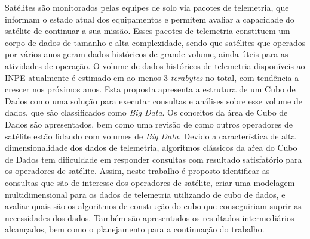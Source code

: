 
\begin{resumo}

\hypertarget{estilo:resumo}{} %

Satélites são monitorados pelas equipes de solo via pacotes de telemetria, que informam o estado atual dos equipamentos e permitem avaliar a capacidade do satélite de continuar a sua missão.
{\color{cerulean}
Esses pacotes de telemetria constituem um corpo de dados de tamanho e alta complexidade, sendo que satélites que operados por vários anos geram dados históricos de grande volume, ainda úteis para as atividades de operação.
O volume de dados históricos de telemetria disponíveis ao INPE atualmente é estimado em ao menos 3 \textit{terabytes} no total, com tendência a crescer nos próximos anos.
Esta proposta apresenta a estrutura de um Cubo de Dados como uma solução para executar consultas e análises sobre esse volume de dados, que são classificados como \textit{Big Data}.
Os conceitos da área de Cubo de Dados são apresentados, bem como uma revisão de como outros operadores de satélite estão lidando com volumes de \textit{Big Data}.
}
Devido a característica de alta dimensionalidade dos dados de telemetria, algoritmos clássicos da aŕea do Cubo de Dados tem dificuldade em responder consultas com resultado satisfatório para os operadores de satélite.
Assim, neste trabalho é proposto identificar as consultas que são de interesse dos operadores de satélite, criar uma modelagem multidimensional para os dados de telemetria utilizando de cubo de dados, e avaliar quais são os algoritmos de construção do cubo que conseguiriam suprir as necessidades dos dados.
{\color{cerulean}
Também são apresentados os resultados intermediários alcançados, bem como o planejamento para a continuação do trabalho.
}


\end{resumo}
